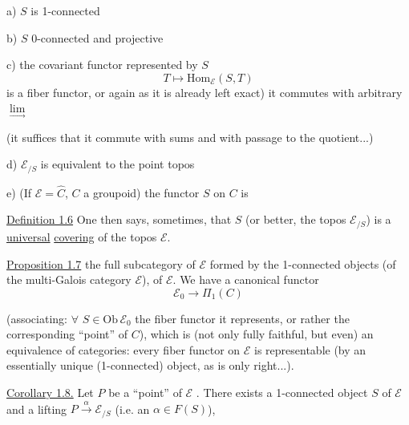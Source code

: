 a) \(S\) is 1-connected

b) \(S\)  0-connected and projective

c) the covariant functor represented by \(S\)
\[
T\longmapsto\mathrm{Hom}_{\mathcal E}(S,T)
\]
is a fiber functor, or again
as it is already left exact) it commutes with
arbitrary \(\underset{\longrightarrow}{\lim}\)

 (it suffices that it commute with sums and with passage
to the quotient...)

d) \(\mathcal E_{/S}\) is equivalent to the point topos

e) (If \(\mathcal E=\widehat C\), \(C\) a groupoid) the functor
\(S\) on \(C\) is 

\uline{Definition 1.6} One then says, sometimes, that \(S\) (or better, the topos
\(\mathcal E_{/S}\)) is a \uline{universal} \uline{covering} of the
 topos \(\mathcal E\).

\uline{Proposition 1.7}
 the full subcategory of
\(\mathcal E\) formed by the 1-connected objects
(of the multi-Galois category \(\mathcal E\)),
  of \(\mathcal E\).
We have  a canonical functor
\[
\mathcal E_0\longrightarrow
\Pi_1(C)
\]

(associating: \(\forall\) \(S\in\mathrm{Ob}\,\mathcal E_0\)
the fiber functor it represents, or rather the corresponding ``point''
of \(C\)), which is
(not only fully faithful, but even) an equivalence of
categories: every fiber functor on \(\mathcal E\) is representable
(by an essentially unique (1-connected) object, as is only right...).


\uline{Corollary 1.8.} Let \(P\) be a ``point'' of \(\mathcal E\)
.
There exists a 1-connected object \(S\) of \(\mathcal E\) and a lifting
\(P\xrightarrow{\alpha}\mathcal E_{/S}\)
(i.e. an \(\alpha\in F(S)\)),


